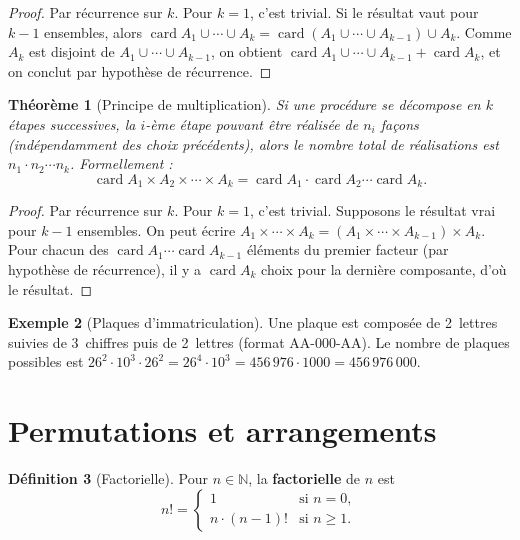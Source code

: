 \documentclass[12pt,a4paper,openany]{book}
\theoremstyle{definition}
\newtheorem{definition}{Définition}[chapter]
\newtheorem{exemple}[definition]{Exemple}
\theoremstyle{plain}
\newtheorem{theoreme}[definition]{Théorème}
\theoremstyle{remark}
\newcommand{\N}{\mathbb{N}}
\DeclareMathOperator{\card}{card}
\begin{document}
\begin{proof}
Par récurrence sur $k$. Pour $k=1$, c'est trivial. Si le résultat vaut
pour $k-1$ ensembles, alors
$\card{A_1 \cup \cdots \cup A_k} = \card{(A_1 \cup \cdots \cup A_{k-1}) \cup A_k}$.
Comme $A_k$ est disjoint de $A_1 \cup \cdots \cup A_{k-1}$, on obtient
$\card{A_1 \cup \cdots \cup A_{k-1}} + \card{A_k}$, et on conclut par
hypothèse de récurrence.
\end{proof}

\begin{theoreme}[Principe de multiplication]\label{thm:principe-multiplication}
Si une procédure se décompose en $k$ étapes successives, la $i$-ème étape
pouvant être réalisée de $n_i$ façons (indépendamment des choix précédents),
alors le nombre total de réalisations est $n_1 \cdot n_2 \cdots n_k$.
Formellement :
\[
  \card{A_1 \times A_2 \times \cdots \times A_k}
  = \card{A_1} \cdot \card{A_2} \cdots \card{A_k}.
\]
\end{theoreme}

\begin{proof}
Par récurrence sur $k$. Pour $k=1$, c'est trivial. Supposons le résultat
vrai pour $k-1$ ensembles. On peut écrire
$A_1 \times \cdots \times A_k = (A_1 \times \cdots \times A_{k-1}) \times A_k$.
Pour chacun des $\card{A_1} \cdots \card{A_{k-1}}$ éléments du premier
facteur (par hypothèse de récurrence), il y a $\card{A_k}$ choix pour la
dernière composante, d'où le résultat.
\end{proof}

\begin{exemple}[Plaques d'immatriculation]\label{ex:plaques}
Une plaque est composée de 2~lettres suivies de 3~chiffres puis de 2~lettres
(format AA-000-AA). Le nombre de plaques possibles est
$26^2 \cdot 10^3 \cdot 26^2 = 26^4 \cdot 10^3 = 456\,976 \cdot 1000
= 456\,976\,000$.
\end{exemple}

\section{Permutations et arrangements}\label{sec:permutations}

\begin{definition}[Factorielle]\label{def:factorielle}
Pour $n \in \N$, la \textbf{factorielle} de $n$ est
\[
  n! = \begin{cases} 1 & \text{si } n = 0, \\ n \cdot (n-1)! & \text{si } n \geq 1. \end{cases}
\]
\end{definition}
\end{document}
